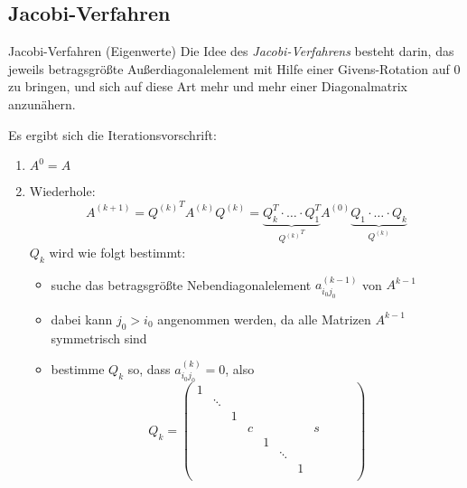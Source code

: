\subsection{Jacobi-Verfahren}

\begin{defi}{Jacobi-Verfahren (Eigenwerte)}
    Die Idee des \emph{Jacobi-Verfahrens} besteht darin, das jeweils betragsgrößte Außerdiagonalelement mit Hilfe einer Givens-Rotation auf $0$ zu bringen, und sich auf diese Art mehr und mehr einer Diagonalmatrix anzunähern.

    Es ergibt sich die Iterationsvorschrift:
    \begin{enumerate}
        \item $A^{0} = A$
        \item Wiederhole:
              \[
                  A^{(k+1)} = {Q^{(k)}}^T A^{(k)} Q^{(k)} = \underbrace{Q_k^T \cdot \ldots \cdot Q_1^T}_{{Q^{(k)}}^T} A^{(0)} \underbrace{Q_1 \cdot \ldots \cdot Q_k}_{Q^{(k)}}
              \]
              $Q_k$ wird wie folgt bestimmt:
              \begin{itemize}
                  \item suche das betragsgrößte Nebendiagonalelement $a_{i_0 j_0}^{(k-1)}$ von $A^{k-1}$
                  \item dabei kann $j_0 > i_0$ angenommen werden, da alle Matrizen $A^{k-1}$ symmetrisch sind
                  \item bestimme $Q_k$ so, dass $a_{i_0 j_0}^{(k)} = 0$, also
                        \[
                            Q_k =
                            \begin{pmatrix}
                                1 &        &   &    &   &        &   &   &   &        &   \\
                                  & \ddots &   &    &   &        &   &   &   &        &   \\
                                  &        & 1 &    &   &        &   &   &   &        &   \\
                                  &        &   & c  &   &        &   & s &   &        &   \\
                                  &        &   &    & 1 &        &   &   &   &        &   \\
                                  &        &   &    &   & \ddots &   &   &   &        &   \\
                                  &        &   &    &   &        & 1 &   &   &        &   \\

\end{pmatrix}\]
\end{itemize}
\end{enumerate}
\end{defi}
